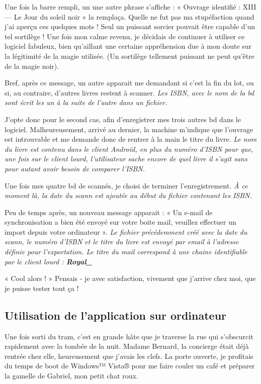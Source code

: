 Une fois la barre rempli, un une autre phrase s'affiche : « Ouvrage identifié : XIII — Le Jour du soleil noir » la remplaça.
Quelle ne fut pas ma stupéfaction quand j'ai aperçu ces quelques mots !
Seul un puissant sorcier pouvait être capable d'un tel sortilège !
Une fois mon calme revenu, je décidais de continuer à utiliser ce logiciel fabuleux, bien qu'aillant une certaine appréhension due à mon doute sur la légitimité de la magie utilisée. 
(Un sortilège tellement puissant ne peut qu'être de la magie noir).

Bref, après ce message, un autre apparait me demandant si c'est la fin du lot, ou si, au contraire, d'autres livres restent à scanner. 
\emph{Les ISBN, avec le nom de la bd sont écrit les un à la suite de l'autre dans un fichier.} 

J'opte donc pour le second cas, afin d'enregistrer mes trois autres bd dans le logiciel. 
Malheureusement, arrivé au dernier, la machine m'indique que l'ouvrage est introuvable et me demande donc de rentrer à la main le titre du livre. 
\emph{Le nom du livre est contenu dans le client Androïd, en plus du numéro d'ISBN pour que, une fois sur le client lourd,
	l'utilisateur sache encore de quel livre il s'agit sans pour autant avoir besoin de comparer l'ISBN.}

Une fois mes quatre bd de scannés, je choisi de terminer l'enregistrement. 
\emph{À ce moment là, la date du scann est ajoutée au début du fichier contenant les ISBN.}

Peu de temps après, un nouveau message apparait : « Un e-mail de synchronisation a bien été envoyé sur votre boite mail, veuillez effectuer un import depuis votre ordinateur ».
\emph{Le fichier précédemment créé avec la date du scann, le numéro d'ISBN et le titre du livre est envoyé par email à l'adresse définie pour l'exportation. 
	Le titre du mail correspond à une chaine identifiable par le client lourd : \textbf{Royal\_}
}

« Cool alors ! » Pensais - je avec satisfaction, vivement que j'arrive chez moi, que je puisse tester tout ça !


\subsection{Utilisation de l'application sur ordinateur}
Une fois sorti du tram, c'est en grande hâte que je traverse la rue qui s'obscurcit rapidement avec la tombée de la nuit. 
Madame Bernard, la concierge était déjà rentrée chez elle, heureusement que j'avais les clefs. 
La porte ouverte, je profitais du temps de boot de Windows™ Vista® pour me faire couler un café et préparer la gamelle de Gabriel, mon petit chat roux.

